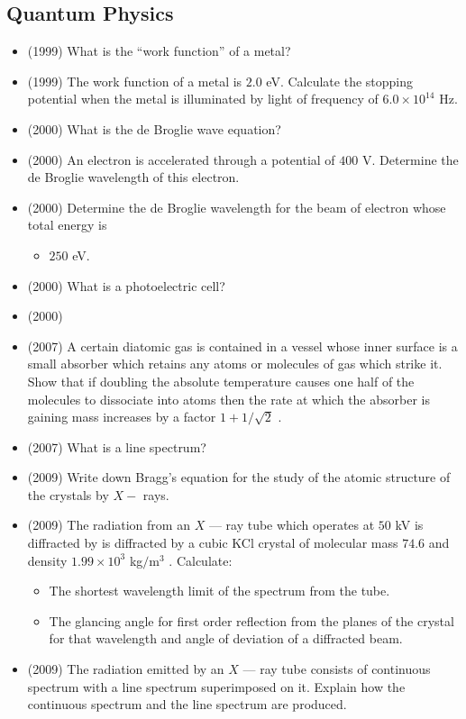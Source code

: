 \documentclass{article}
\begin{document}
\subsection{Quantum Physics}
\begin{itemize}
\item (1999)  What is the “work function” of a metal?
\item (1999)  The work function of a metal is $ 2.0$ eV. Calculate the stopping potential when the metal is illuminated by light of frequency of $ 6.0 \times 10^{14}$ Hz.
\item (2000)  What is the de Broglie wave equation?
\item (2000)  An electron is accelerated through a potential of $ 400$ V. Determine the de Broglie wavelength of this electron.
\item (2000)  Determine the de Broglie wavelength for the beam of electron whose total energy is\begin{itemize}
\item $ 250$ eV.
\end{itemize}
\item (2000)  What is a photoelectric cell?
\item (2000)  \item (2007)  A certain diatomic gas is contained in a vessel whose inner surface is a small absorber which retains any atoms or molecules of gas which strike it.  Show that if doubling the absolute temperature causes one half of the molecules to dissociate into atoms then the rate at which the absorber is gaining mass increases by a factor $ 1+1/\sqrt{2}$ .
\item (2007)  What is a line spectrum? 
\item (2009)  Write down Bragg’s equation for the study of the atomic structure of the crystals by $ X-$ rays.
\item (2009)  The radiation from an $ X$ — ray tube which operates at $ 50$ kV is diffracted by is diffracted by a cubic KCl crystal of molecular mass $ 74.6$ and density $ 1.99 \times 10^{3}$ kg$/$m$ ^{3}$ .  Calculate:\begin{itemize}
\item The shortest wavelength limit of the spectrum from the tube.
\item The glancing angle for first order reflection from the planes of the crystal for that wavelength and angle of deviation of a diffracted beam.
\end{itemize}
\item (2009)  The radiation emitted by an $ X$ — ray tube consists of continuous spectrum with a line spectrum superimposed on it. Explain how the continuous spectrum and the line spectrum are produced.\begin{itemize}

\end{itemize}
\end{itemize}
\end{document}
